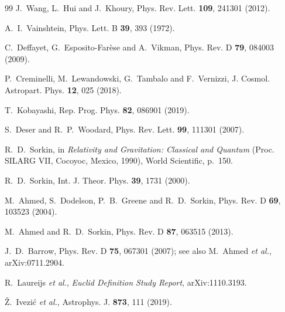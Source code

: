 \documentclass[aps,prd,twocolumn,superscriptaddress,nofootinbib,floatfix]{revtex4-2}
\begin{document}
\begin{thebibliography}{99}
 J.~Wang, L.~Hui and J.~Khoury,
Phys. Rev. Lett. \textbf{109}, 241301 (2012).

 A.~I.~Vainshtein,
Phys. Lett. B \textbf{39}, 393 (1972).

 C.~Deffayet, G.~Esposito-Far\`ese and A.~Vikman,
Phys. Rev. D \textbf{79}, 084003 (2009).

 P.~Creminelli, M.~Lewandowski, G.~Tambalo and
F.~Vernizzi, J. Cosmol. Astropart. Phys. \textbf{12}, 025 (2018).

 T.~Kobayashi,
Rep. Prog. Phys. \textbf{82}, 086901 (2019).

 S.~Deser and R.~P.~Woodard,
Phys. Rev. Lett. \textbf{99}, 111301 (2007).

 R.~D.~Sorkin, in \emph{Relativity and Gravitation:
Classical and Quantum} (Proc. SILARG VII, Cocoyoc, Mexico, 1990),
World Scientific, p.~150.

 R.~D.~Sorkin,
Int. J. Theor. Phys. \textbf{39}, 1731 (2000).

 M.~Ahmed, S.~Dodelson, P.~B.~Greene and
R.~D.~Sorkin, Phys. Rev. D \textbf{69}, 103523 (2004).

 M.~Ahmed and R.~D.~Sorkin,
Phys. Rev. D \textbf{87}, 063515 (2013).

 J.~D.~Barrow,
Phys. Rev. D \textbf{75}, 067301 (2007);
see also M.~Ahmed \emph{et al.}, arXiv:0711.2904.

 R.~Laureijs \emph{et al.},
\emph{Euclid Definition Study Report}, arXiv:1110.3193.

 \v{Z}.~Ivezi\'c \emph{et al.},
Astrophys. J. \textbf{873}, 111 (2019).

\end{thebibliography}
\end{document}

